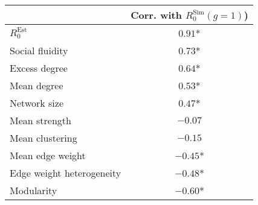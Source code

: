 \begin{tabular}{l|c} 
 \toprule 
 & Corr. with $R_{0}^{\text{Sim}}(g=1)$)  \\ 
 \midrule 
$R_{0}^{\text{Est}}$ & $0.91 $*\\ 
Social fluidity & $0.73 $*\\ 
Excess degree & $0.64 $*\\ 
Mean degree & $0.53 $*\\ 
Network size & $0.47 $*\\ 
Mean strength & $-0.07 $\\ 
Mean clustering & $-0.15 $\\ 
Mean edge weight & $-0.45 $*\\ 
Edge weight heterogeneity & $-0.48 $*\\ 
Modularity & $-0.60 $*\\ 
\bottomrule 
 \end{tabular} 
